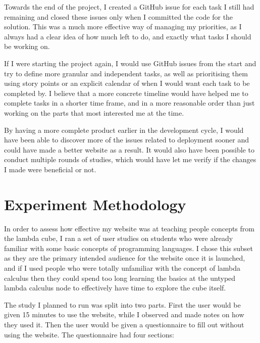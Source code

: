 \documentclass{l4proj}
\begin{document}
Towards the end of the project, I created a GitHub issue for each task I still had remaining and closed these issues only when I committed the code for the solution.  This was a much more effective way of managing my priorities, as I always had a clear idea of how much left to do, and exactly what tasks I should be working on.

If I were starting the project again, I would use GitHub issues from the start and try to define more granular and independent tasks, as well as prioritising them using story points or an explicit calendar of when I would want each task to be completed by.  I believe that a more concrete timeline would have helped me to complete tasks in a shorter time frame, and in a more reasonable order than just working on the parts that most interested me at the time.

By having a more complete product earlier in the development cycle, I would have been able to discover more of the issues related to deployment sooner and could have made a better website as a result.  It would also have been possible to conduct multiple rounds of studies, which would have let me verify if the changes I made were beneficial or not.

\section{Experiment Methodology}

In order to assess how effective my website was at teaching people concepts from the lambda cube, I ran a set of user studies on students who were already familiar with some basic concepts of programming languages.  I chose this subset as they are the primary intended audience for the website once it is launched, and if I used people who were totally unfamiliar with the concept of lambda calculus then they could spend too long learning the basics at the untyped lambda calculus node to effectively have time to explore the cube itself.

The study I planned to run was split into two parts.  First the user would be given 15 minutes to use the website, while I observed and made notes on how they used it.  Then the user would be given a questionnaire to fill out without using the website.  The questionnaire had four sections:
\end{document}
